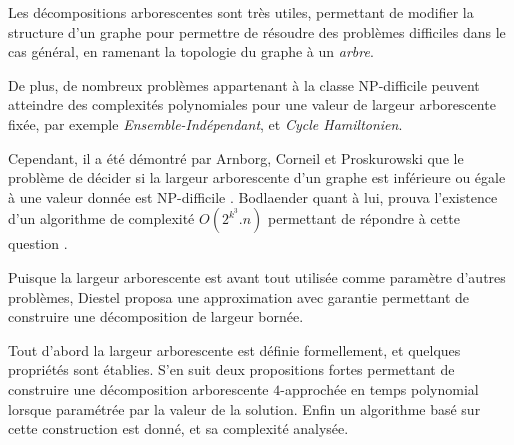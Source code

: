 

Les décompositions arborescentes sont très utiles, permettant
de modifier la structure d'un graphe pour permettre de résoudre
des problèmes difficiles dans le cas général, en ramenant la topologie
du graphe à un {\em arbre}.

De plus, de nombreux problèmes appartenant à la classe NP-difficile
peuvent atteindre des complexités polynomiales pour une valeur de
largeur arborescente fixée, par exemple {\em Ensemble-Indépendant},
et {\em Cycle Hamiltonien}.

Cependant, il a été démontré par Arnborg, Corneil et Proskurowski que le
problème de décider si la largeur arborescente d'un graphe est inférieure
ou égale à une valeur donnée est NP-difficile \cite{arnborg}.
Bodlaender quant à lui, prouva l'existence d'un 
algorithme de complexité $O(2^{k^3}.n)$ permettant de répondre
à cette question \cite{bodlaender}.

Puisque la largeur arborescente est avant tout utilisée comme
paramètre d'autres problèmes, Diestel \cite{diestel} proposa une approximation
avec garantie permettant de construire une décomposition de largeur
bornée.

Tout d'abord la largeur arborescente est définie formellement, et quelques propriétés
sont établies. S'en suit deux propositions fortes permettant de construire une
décomposition arborescente $4$-approchée en temps polynomial lorsque paramétrée par
la valeur de la solution.
Enfin un algorithme basé sur cette construction est donné, et sa complexité analysée.


